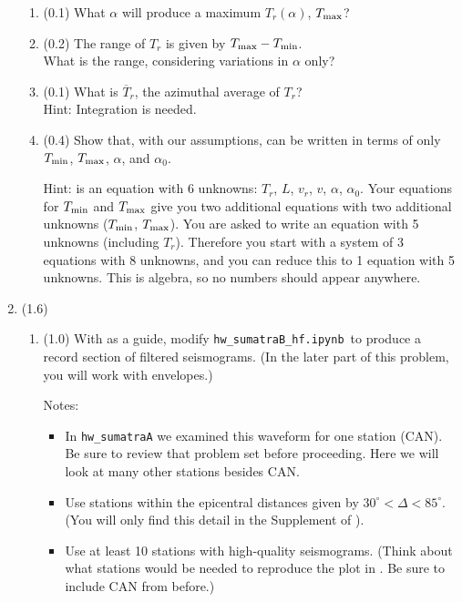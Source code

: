 \documentclass[11pt,titlepage,fleqn]{article}
\newcommand{\tfilehf}{{\tt hw\_sumatraB\_hf.ipynb}}
\begin{document}
\begin{enumerate}
\begin{enumerate}
\item (0.1) What $\alpha$ will produce a maximum $T_r(\alpha)$, $T_{\rm max}$?
\item (0.2) The range of $T_r$ is given by $T_{\rm max} - T_{\rm min}$. \\
What is the range, considering variations in $\alpha$ only?
\item (0.1) What is $\overline{T}_r$, the azimuthal average of $T_r$? \\
Hint: Integration is needed.
\item (0.4) Show that, with our assumptions,  can be written in terms of only $T_{\rm min}$, $T_{\rm max}$, $\alpha$, and $\alpha_0$.

Hint:  is an equation with 6 unknowns: $T_r$, $L$, $v_r$, $v$, $\alpha$, $\alpha_0$. Your equations for $T_{\rm min}$ and $T_{\rm max}$ give you two additional equations with two additional unknowns ($T_{\rm min}$, $T_{\rm max}$). You are asked to write an equation with 5 unknowns (including $T_r$). Therefore you start with a system of 3 equations with 8 unknowns, and you can reduce this to 1 equation with 5 unknowns. This is algebra, so no numbers should appear anywhere.

\end{enumerate}


\item (1.6) 
\begin{enumerate}
\item (1.0) With \citet[][Figure~1d]{Ni2005} as a guide, modify \tfilehf\ to produce a record section of filtered seismograms. (In the later part of this problem, you will work with envelopes.)

Notes:
%
\begin{itemize}
\item In \verb+hw_sumatraA+ we examined this waveform for one station (CAN). Be sure to review that problem set before proceeding. Here we will look at many other stations besides CAN.

\item Use stations within the epicentral distances given by $30^\circ < \Delta < 85^\circ$. (You will only find this detail in the Supplement of \citet{Ni2005}).

\item Use at least 10 stations with high-quality seismograms. (Think about what stations would be needed to reproduce the plot in \citet{Ni2005}. Be sure to include CAN from before.)


\end{itemize}
\end{enumerate}
\end{enumerate}
\end{document}
